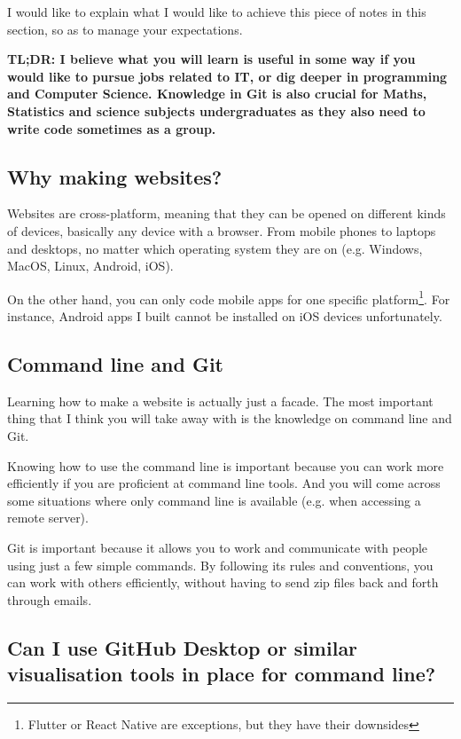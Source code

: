 I would like to explain what I would like to achieve this piece of notes in this section, so as to manage your expectations.
\vspace{6mm}

\textbf{TL;DR: I believe what you will learn is useful in some way if you would like to pursue jobs related to IT, or dig deeper in programming and Computer Science. Knowledge in Git is also crucial for Maths, Statistics and science subjects undergraduates as they also need to write code sometimes as a group.}

\subsection*{Why making websites?}

Websites are cross-platform, meaning that they can be opened on different kinds of devices, basically any device with a browser. From mobile phones to laptops and desktops, no matter which operating system they are on (e.g. Windows, MacOS, Linux, Android, iOS).

On the other hand, you can only code mobile apps for one specific platform\footnote{Flutter or React Native are exceptions, but they have their downsides}. For instance, Android apps I built cannot be installed on iOS devices unfortunately.

\subsection*{Command line and Git}

Learning how to make a website is actually just a facade. The most important thing that I think you will take away with is the knowledge on command line and Git.

Knowing how to use the command line is important because you can work more efficiently if you are proficient at command line tools. And you will come across some situations where only command line is available (e.g. when accessing a remote server). 

Git is important because it allows you to work and communicate with people using just a few simple commands. By following its rules and conventions, you can work with others efficiently, without having to send zip files back and forth through emails. 

\subsection*{Can I use GitHub Desktop or similar visualisation tools in place for command line?}

